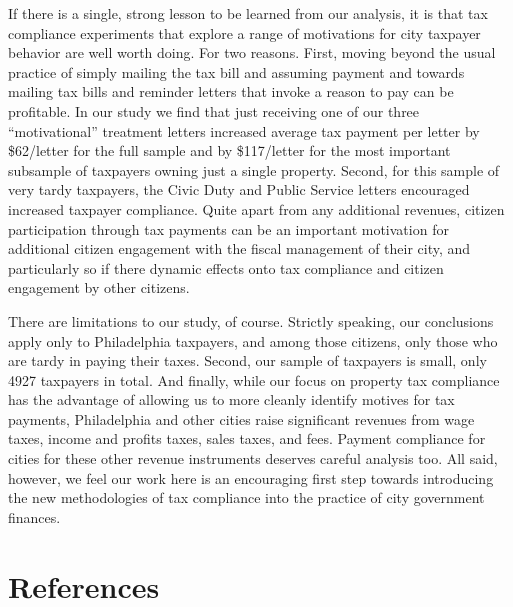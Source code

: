 \documentclass[12pt,titlepage]{article}
\begin{document}
If there is a single, strong lesson to be learned from our analysis, 
it is that tax compliance experiments that explore a range of 
motivations for city taxpayer behavior are well worth doing.  For two 
reasons.    First, moving beyond the usual practice of simply mailing 
the tax bill and assuming payment and towards mailing tax bills and 
reminder letters that invoke a reason to pay can be profitable.  
In our study we find that just receiving one of our three “motivational” 
treatment letters increased average tax payment per letter by \$62/letter 
for the full sample and by \$117/letter for the most important subsample 
of taxpayers owning just a single property.  Second, for this sample of 
very tardy taxpayers, the Civic Duty and Public Service letters 
encouraged increased taxpayer compliance.   Quite apart from any 
additional revenues, citizen participation through tax payments can be 
an important motivation for additional citizen engagement with the 
fiscal management of their city, and particularly so if there dynamic 
effects onto tax compliance and citizen engagement by other citizens.      


There are limitations to our study, of course.  Strictly speaking, our
conclusions apply only to Philadelphia taxpayers, and among those
citizens, only those who are tardy in paying their taxes. Second, our
sample of taxpayers is small, only  4927 taxpayers in total.  And finally, while
our focus on property tax compliance has the advantage of allowing us
to more cleanly identify motives for tax payments, Philadelphia and
other cities raise significant revenues from wage taxes, income and
profits taxes, sales taxes, and fees.  Payment compliance for cities
for these other revenue instruments deserves careful analysis too.
All said, however, we feel our work here is an encouraging first step
towards introducing the new methodologies of tax compliance into the
practice of city government finances.

\newpage

\section*{References}
\end{document}
